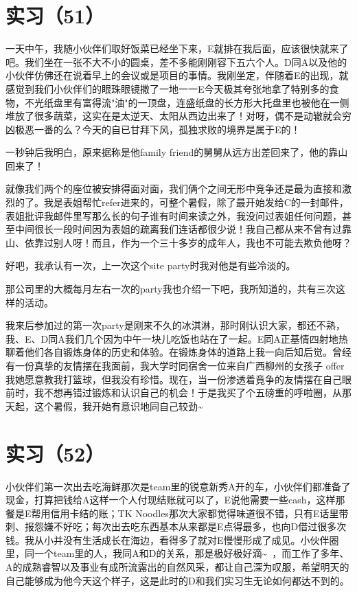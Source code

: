 \documentclass[12pt]{book}
\begin{document}
\section{实习（51）}
\label{sec-5-54}

一天中午，我随小伙伴们取好饭菜已经坐下来，E就排在我后面，应该很快就来了吧。我们坐在一张不大不小的圆桌，差不多能刚刚容下五六个人。D同A以及他的小伙伴仿佛还在说着早上的会议或是项目的事情。我刚坐定，伴随着E的出现，就感觉到我们小伙伴们的眼珠眼镜撒了一地一一E今天极其夸张地拿了特别多的食物，不光纸盘里有富得流"油"的一顶盘，连盛纸盘的长方形大托盘里也被他在一侧堆放了很多蔬菜，这实在是太逆天、太阳从西边出来了！对呀，偶不是动辙就会穷凶极恶一番的么？今天的自已甘拜下风，孤独求败的境界是属于E的！

一秒钟后我明白，原来据称是他family friend的舅舅从远方出差回来了，他的靠山回来了！

就像我们两个的座位被安排得面对面，我们俩个之间无形中竞争还是最为直接和激烈的了。我是表姐帮忙refer进来的，可整个暑假，除了最开始发给C的一封邮件，表姐批评我邮件里写那么长的句子谁有时间来读之外，我没问过表姐任何问题，甚至中间很长一段时间因为表姐的疏离我们连话都很少说！我自己都从来不曾有过靠山、依靠过别人呀！而且，作为一个三十多岁的成年人，我也不可能去欺负他呀？

好吧，我承认有一次，上一次这个site party时我对他是有些冷淡的。

那公司里的大概每月左右一次的party我也介绍一下吧，我所知道的，共有三次这样的活动。

我来后参加过的第一次party是刚来不久的冰淇淋，那时刚认识大家，都还不熟，我、E、D同A我们几个因为中午一块儿吃饭也站在了一起。E同A正基情四射地热聊着他们各自锻炼身体的历史和体验。在锻炼身体的道路上我一向后知后觉。曾经有一份真挚的友情摆在我面前，我大学时同宿舍一位来自广西柳州的女孩子 offer 我她愿意教我打篮球，但我没有珍惜。现在，当一份渗透着竟争的友情摆在自己眼前时，我不想再错过锻炼和认识自己的机会！于是我买了个五磅重的呼啦圈，从那天起，这个暑假，我开始有意识地同自己较劲\textasciitilde{}~ 　


\section{实习（52）}
\label{sec-5-55}

小伙伴们第一次出去吃海鲜那次是team里的锐意新秀A开的车，小伙伴们都准备了现金，打算把钱给A这样一个人付现结账就可以了，E说他需要一些cash，这样那餐是E帮用信用卡结的账；TK Noodles那次大家都觉得味道很不错，只有E话里带刺、报怨嫌不好吃；每次出去吃东西基本从来都是E点得最多，也向D借过很多次钱。我从小并没有生活成长在海边，看得多了就对E慢慢形成了成见。小伙伴圈里，同一个team里的人，我同A和D的关系，那是极好极好滴\textasciitilde{}~，而工作了多年、A的成熟睿智以及事业有成所流露出的自然风采，都让自己深为叹服，希望明天的自己能够成为他今天这个样子，这是此时的D和我们实习生无论如何都达不到的。　
\end{document}
